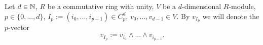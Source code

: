 \begin{notation}
  Let
    $d \in \mathbb{N}$,
    $R$ be a commutative ring with unity,
    $V$ be a $d$-dimensional $R$-module,
    $p \in \{0, ..., d\}$,
    $I_p := (i_0, ..., i_{p - 1}) \in C^d_p$,
    $v_0, ..., v_{d - 1} \in V$.
  By $v_{I_p}$ we will denote the $p$-vector
  \begin{equation}
    v_{I_p} := v_{i_0} \wedge ... \wedge v_{i_{p - 1}}.
  \end{equation}
\end{notation}

